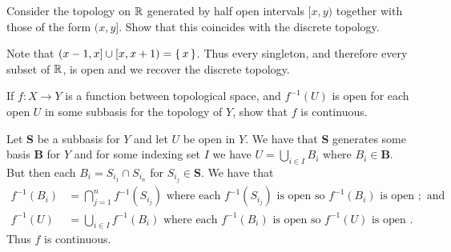 \documentclass[letterpaper, 11pt, oneside]{book}
\begin{document}
\begin{exercise}
  Consider the topology on $\mathbb{R}$ generated by half open intervals $[x, y)$ together with those of the form $(x, y]$.
  Show that this coincides with the discrete topology.
\end{exercise}
\begin{pf}
  Note that $(x - 1, x] \cup [x, x + 1) = \set{x}$.
  Thus every singleton, and therefore every subset of $\mathbb{R}$, is open and we recover the discrete topology.
\end{pf}

\clearpage

\begin{exercise}
  If $f\colon X \to Y$ is a function between topological space, and $f^{-1}(U)$ is open for each open $U$ in some subbasis for the topology of $Y$, show that $f$ is continuous.
\end{exercise}
\begin{pf}
  Let \textbf{S} be a subbasis for $Y$ and let $U$ be open in $Y$.
  We have that \textbf{S} generates some basis \textbf{B} for $Y$ and for some indexing set $I$ we have $U = \bigcup_{i \in I} B_{i}$ where $B_{i} \in \textbf{B}$.
  But then each $B_{i} = S_{i_{1}} \cap S_{i_{n}}$ for $S_{i_{j}} \in \textbf{S}$.
  We have that
  \begin{align*}
    f^{-1}(B_{i}) &= \bigcap_{j = 1}^{n} f^{-1}(S_{i_{j}}) \text{ where each } f^{-1}(S_{i_{j}}) \text{ is open so } f^{-1}(B_{i}) \text{ is open }; \text{ and} \\
    f^{-1}(U) &= \bigcup_{i \in I} f^{-1}(B_{i}) \text{ where each } f^{-1}(B_{i}) \text{ is open so } f^{-1}(U) \text{ is open }.
  \end{align*}
  Thus $f$ is continuous.
\end{pf}

\clearpage
\end{document}
